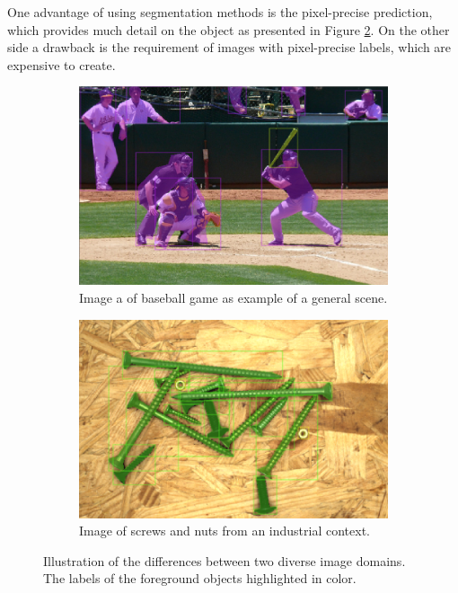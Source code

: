 One advantage of using segmentation methods is the pixel-precise prediction, which provides much detail on the object as presented in Figure \ref{fig:ch1:image_industrial}.
On the other side a drawback is the requirement of images with pixel-precise labels, which are expensive to create.
\begin{figure} [b]
	\centering
	\begin{subfigure}[b]{0.4\textwidth}
		\centering
		\includegraphics[width=\textwidth]{figures/chap1_general_objects.png}
		\caption{
			Image a of baseball game as example of a general scene.}
		\label{fig:ch1:image_standards}
	\end{subfigure}
	\hfill
	\begin{subfigure}[b]{0.4\textwidth}
		\centering
		\includegraphics[width=\textwidth]{figures/chap1_industrial_objects.png}
		\caption{
			Image of screws and nuts from an industrial context.}
		\label{fig:ch1:image_industrial}
	\end{subfigure}
	\caption[Semantic Segmentation Visualization]{
		Illustration of the differences between two diverse image domains.
		The labels of the foreground objects highlighted in color.
	} \label{fig:ch1:image}
\end{figure}


